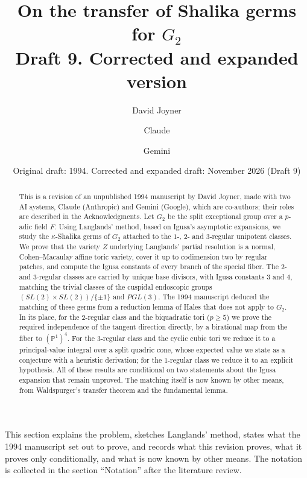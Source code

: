 \documentclass[12pt,letterpaper]{amsart}
\title[Transfer of Shalika germs for \texorpdfstring{$G_2$}{G2}]{On the transfer of Shalika germs for \texorpdfstring{$G_2$}{G2}\\[4pt]
\normalsize Draft 9. Corrected and expanded version}
\author{David Joyner}
\author{Claude}
\author{Gemini}
\date{Original draft: 1994. Corrected and expanded draft: November 2026 (Draft 9)}
\theoremstyle{plain}
\theoremstyle{definition}
\theoremstyle{remark}
\theoremstyle{definition}
\begin{document}
\begin{abstract}
This is a revision of an unpublished 1994 manuscript by David Joyner, made
with two AI systems, Claude (Anthropic) and Gemini (Google), which are
co-authors; their roles are described in the Acknowledgments. Let $G_2$ be the
split exceptional group over a $p$-adic field $F$. Using Langlands' method,
based on Igusa's asymptotic expansions, we study the $\kappa$-Shalika germs of
$G_2$ attached to the $1$-, $2$- and $3$-regular unipotent classes. We prove
that the variety $Z$ underlying Langlands' partial resolution is a normal,
Cohen--Macaulay affine toric variety, cover it up to codimension two by regular
patches, and compute the Igusa constants of every branch of the special fiber.
The $2$- and $3$-regular classes are carried by unique base divisors, with
Igusa constants $3$ and $4$, matching the trivial classes of the cuspidal
endoscopic groups $(SL(2)\times SL(2))/\{\pm1\}$ and $PGL(3)$. The 1994
manuscript deduced the matching of these germs from a reduction lemma of Hales
that does not apply to $G_2$. In its place, for the $2$-regular class and the
biquadratic tori ($p\ge5$) we prove the required independence of the tangent
direction directly, by a birational map from the fiber to $(\mathbb{P}^1)^4$.
For the $3$-regular class and the cyclic cubic tori we reduce it to a
principal-value integral over a split quadric cone, whose expected value we
state as a conjecture with a heuristic derivation; for the $1$-regular class we
reduce it to an explicit hypothesis. All of these
results are conditional on two statements about the Igusa expansion that remain
unproved. The matching itself is now known by other means, from Waldspurger's
transfer theorem and the fundamental lemma.
\end{abstract}

\maketitle
\setcounter{tocdepth}{1}
\tableofcontents
\label{sec:0}

This section explains the problem, sketches Langlands' method, states what
the 1994 manuscript set out to prove, and records what this revision proves,
what it proves only conditionally, and what is now known by other means.
The notation is collected in the section ``Notation'' after the literature
review.
\end{document}
